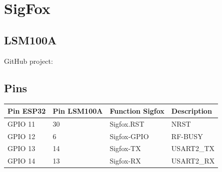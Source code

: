 %
%
%


\chapter{SigFox}

\section{LSM100A}

\cite{LSM100A:2023}

GitHub project: 


\section{Pins}

\begin{tabular}{llll}
  Pin ESP32 &  Pin LSM100A & Function Sigfox & Description \\ \hline
  GPIO 11   &  30          & Sigfox.RST      & NRST \\
  GPIO 12   &  6           & Sigfox-GPIO     & RF-BUSY \\  
  GPIO 13   &  14          & Sigfox-TX       & USART2\_TX \\
  GPIO  14  &  13          & Sigfox-RX       & USART2\_RX \\  
\end{tabular}


